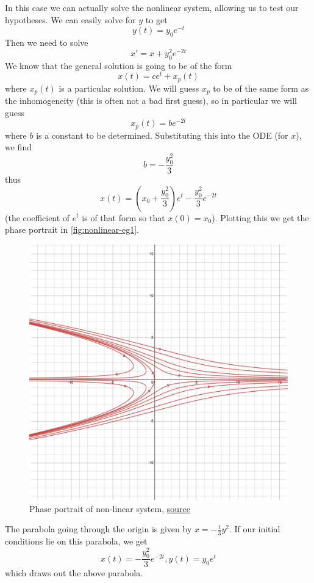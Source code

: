 In this case we can actually solve the nonlinear system, allowing us to test our hypotheses.
We can easily solve for $y$ to get
$$ y(t) = y_0 e^{-t} $$
Then we need to solve
$$ x' = x + y_0^2 e^{-2t} $$
We know that the general solution is going to be of the form
$$ x(t) = ce^{t} + x_p(t) $$
where $x_p(t)$ is a particular solution. We will guess $x_p$ to be of the same form as the inhomogeneity (this is often not a bad first guess), so in particular we will guess
$$ x_p(t) = be^{-2t} $$
where $b$ is a constant to be determined. Substituting this into the ODE (for $x$), we find
$$ b = -\frac{y_0^2}{3} $$
thus
$$ x(t) = \left( x_0 + \frac{y_0^2}{3}  \right)e^{t}  -\frac{y_0^2}{3} e^{-2t}$$
(the coefficient of $e^t$ is of that form so that $x(0) = x_0$). Plotting this we get the phase portrait in \autoref{fig:nonlinear-eg1}.

\begin{figure}[h]
    \centering
    \includegraphics[scale=0.17]{Images/nonlinear_eg1.png}
    \caption{Phase portrait of non-linear system,  \href{https://www.desmos.com/calculator/hda60sxrdf}{source}}
    \label{fig:nonlinear-eg1}
\end{figure}

The parabola going through the origin is given by $x = -\frac{1}{3}y^2$. If our initial conditions lie on this parabola, we get
$$ x(t) = -\frac{y_0^2}{3} e^{-2t}, y(t) = y_0e^{t} $$
which draws out the above parabola.

